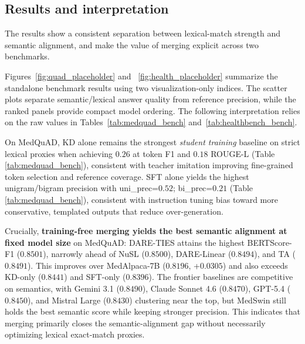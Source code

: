 \documentclass[conference]{IEEEtran}
\begin{document}
\subsection{Results and interpretation}
The results show a consistent separation between lexical-match strength and semantic alignment, and make the value of merging explicit across two benchmarks. 

Figures~\ref{fig:quad_placeholder} and  ~\ref{fig:health_placeholder} summarize the standalone benchmark results using two visualization-only indices. The scatter plots separate semantic/lexical answer quality from reference precision, while the ranked panels provide compact model ordering. The following interpretation relies on the raw values in Tables~\ref{tab:medquad_bench} and~\ref{tab:healthbench_bench}.

On MedQuAD, KD alone remains the strongest \emph{student training} baseline on strict lexical proxies when achieving $0.26$ at token F1 and $0.18$ ROUGE-L (Table \ref{tab:medquad_bench}), consistent with teacher imitation improving fine-grained token selection and reference coverage. SFT alone yields the highest unigram/bigram precision with uni\_prec=$0.52$; bi\_prec=$0.21$ (Table \ref{tab:medquad_bench}), consistent with instruction tuning bias toward more conservative, templated outputs that reduce over-generation.

Crucially, \textbf{training-free merging yields the best semantic alignment at fixed model size} on MedQuAD: DARE-TIES attains the highest BERTScore-F1 ($0.8501$), narrowly ahead of NuSL ($0.8500$), DARE-Linear ($0.8494$), and TA ($0.8491$). This improves over MedAlpaca-7B ($0.8196$, +$0.0305$) and also exceeds KD-only ($0.8441$) and SFT-only ($0.8396$). The frontier baselines are competitive on semantics, with Gemini 3.1 ($0.8490$), Claude Sonnet 4.6 ($0.8470$), GPT-5.4 ($0.8450$), and Mistral Large ($0.8430$) clustering near the top, but MedSwin still holds the best semantic score while keeping stronger precision. This indicates that merging primarily closes the semantic-alignment gap without necessarily optimizing lexical exact-match proxies.
\end{document}
